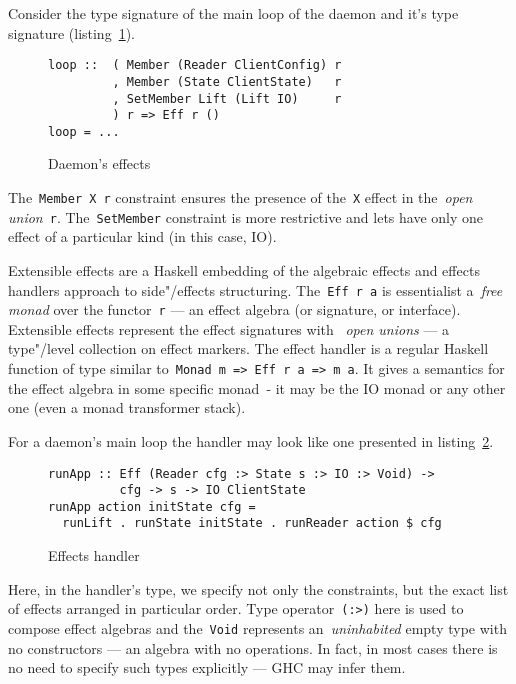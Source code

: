 Consider the type signature of the main loop of the daemon and it's type signature
(listing~\ref{listing:sbbDaemonEffects}).

\begin{figure}[h]
\begin{lstlisting}
loop ::  ( Member (Reader ClientConfig) r
         , Member (State ClientState)   r
         , SetMember Lift (Lift IO)     r
         ) r => Eff r ()
loop = ...
\end{lstlisting}
\caption{Daemon's effects}
\label{listing:sbbDaemonEffects}
\end{figure}

The~\lstinline{Member X r} constraint ensures the presence of
the~\lstinline{X} effect in the~\emph{open union}~\lstinline{r}. The~\lstinline{SetMember}
constraint is more restrictive and lets have only one effect of a particular kind
(in this case, IO).

Extensible effects are a Haskell embedding of the algebraic effects and effects handlers
approach to side"/effects structuring. The~\lstinline{Eff r a} is essentialist
a~\emph{free monad} over the functor~\lstinline{r} --- an effect algebra
(or signature, or interface). Extensible effects represent the effect signatures with
~\emph{open unions} --- a type"/level collection on effect markers.
The effect handler is a regular Haskell function of type similar
to~\lstinline{Monad m => Eff r a => m a}. It gives a semantics for the effect algebra
in some specific monad~\lstinline --- it may be the IO monad or any other one
(even a monad transformer stack).

For a daemon's main loop the handler may look like one presented in
listing~\ref{listing:sbbDaemonHandler}.

\begin{figure}[h]
\begin{lstlisting}
runApp :: Eff (Reader cfg :> State s :> IO :> Void) ->
          cfg -> s -> IO ClientState
runApp action initState cfg =
  runLift . runState initState . runReader action $ cfg
\end{lstlisting}
\caption{Effects handler}
\label{listing:sbbDaemonHandler}
\end{figure}

Here, in the handler's type, we specify not only the constraints, but the exact list of effects
arranged in particular order. Type operator~\lstinline{(:>)} here is used to compose
effect algebras and the~\lstinline{Void} represents an~\emph{uninhabited} empty type
with no constructors --- an algebra with no operations. In fact, in most cases there is
no need to specify such types explicitly --- GHC may infer them.

